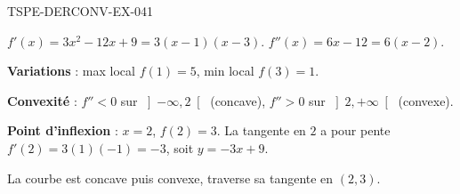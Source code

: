 \begin{corrige}{TSPE-DERCONV-EX-041}

$f'(x) = 3x^2 - 12x + 9 = 3(x-1)(x-3)$. $f''(x) = 6x - 12 = 6(x-2)$.


\textbf{Variations} : max local $f(1)=5$, min local $f(3)=1$.

\textbf{Convexité} : $f''<0$ sur $\left]-\infty,2\right[$ (concave), $f''>0$ sur $\left]2,+\infty\right[$ (convexe).

\textbf{Point d'inflexion} : $x=2$, $f(2)=3$. La tangente en $2$ a pour pente $f'(2) = 3(1)(-1) = -3$, soit $y = -3x+9$.

La courbe est concave puis convexe, traverse sa tangente en $(2,3)$.

\end{corrige}
